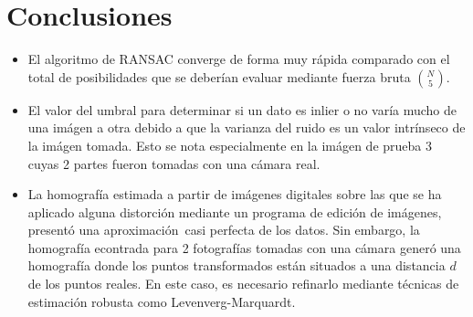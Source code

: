 \documentclass{IEEEtran}
\begin{document}
\section{Conclusiones}
\begin{itemize}
\item El algoritmo de RANSAC converge de forma 
muy rápida comparado con el total de posibilidades
que se deberían evaluar mediante fuerza bruta
$\binom{N}{5}$.
\item El valor del umbral para determinar si un dato 
es inlier o no varía mucho de una imágen a otra debido
a que la varianza del ruido es un valor intrínseco
de la imágen tomada. Esto se nota especialmente en la
imágen de prueba 3 cuyas 2 partes fueron tomadas con
una cámara real.
\item La homografía estimada a partir de imágenes digitales 
sobre las que se ha aplicado alguna distorción mediante 
un programa de edición de imágenes, presentó una aproximación\
casi perfecta de los datos. Sin embargo, la homografía econtrada
para 2 fotografías tomadas con una cámara generó una homografía
donde los puntos transformados están situados a una distancia $d$
de los puntos reales. En este caso, es necesario refinarlo
mediante técnicas de estimación robusta como Levenverg-Marquardt.
\end{itemize} 



\end{document}
